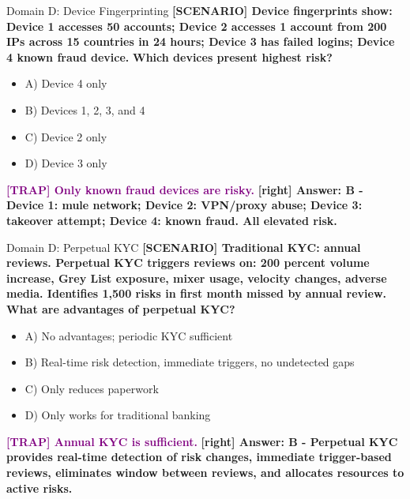 \documentclass[11pt,a4paper]{beamer}
\newcommand{\trap}[1]{\textcolor{purple}{\textbf{[TRAP] #1}}}
\newcommand{\correct}[1]{\textcolor{green!50!black}{\textbf{[right] #1}}}
\newcommand{\scenario}[1]{\textcolor{blue!70!black}{\textbf{[SCENARIO] #1}}}
\begin{document}
\begin{frame}{Domain D: Device Fingerprinting}
\scenario{Device fingerprints show: Device 1 accesses 50 accounts; Device 2 accesses 1 account from 200 IPs across 15 countries in 24 hours; Device 3 has failed logins; Device 4 known fraud device.}
\vspace{0.2cm}
\textbf{Which devices present highest risk?}
\vspace{0.2cm}
\begin{itemize}
    \item A) Device 4 only
    \item B) Devices 1, 2, 3, and 4
    \item C) Device 2 only
    \item D) Device 3 only
\end{itemize}
\vspace{0.2cm}
\trap{Only known fraud devices are risky.}
\correct{Answer: B - Device 1: mule network; Device 2: VPN/proxy abuse; Device 3: takeover attempt; Device 4: known fraud. All elevated risk.}
\end{frame}

\begin{frame}{Domain D: Perpetual KYC}
\scenario{Traditional KYC: annual reviews. Perpetual KYC triggers reviews on: 200 percent volume increase, Grey List exposure, mixer usage, velocity changes, adverse media. Identifies 1,500 risks in first month missed by annual review.}
\vspace{0.2cm}
\textbf{What are advantages of perpetual KYC?}
\vspace{0.2cm}
\begin{itemize}
    \item A) No advantages; periodic KYC sufficient
    \item B) Real-time risk detection, immediate triggers, no undetected gaps
    \item C) Only reduces paperwork
    \item D) Only works for traditional banking
\end{itemize}
\vspace{0.2cm}
\trap{Annual KYC is sufficient.}
\correct{Answer: B - Perpetual KYC provides real-time detection of risk changes, immediate trigger-based reviews, eliminates window between reviews, and allocates resources to active risks.}
\end{frame}
\end{document}

